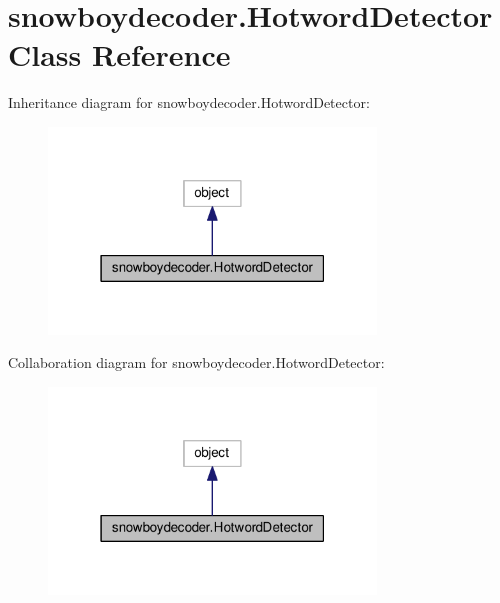 \hypertarget{classsnowboydecoder_1_1HotwordDetector}{}\section{snowboydecoder.\+Hotword\+Detector Class Reference}
\label{classsnowboydecoder_1_1HotwordDetector}


Inheritance diagram for snowboydecoder.\+Hotword\+Detector\+:\nopagebreak
\begin{figure}[H]
\begin{center}
\leavevmode
\includegraphics[width=247pt]{classsnowboydecoder_1_1HotwordDetector__inherit__graph}
\end{center}
\end{figure}


Collaboration diagram for snowboydecoder.\+Hotword\+Detector\+:\nopagebreak
\begin{figure}[H]
\begin{center}
\leavevmode
\includegraphics[width=247pt]{classsnowboydecoder_1_1HotwordDetector__coll__graph}
\end{center}
\end{figure}
